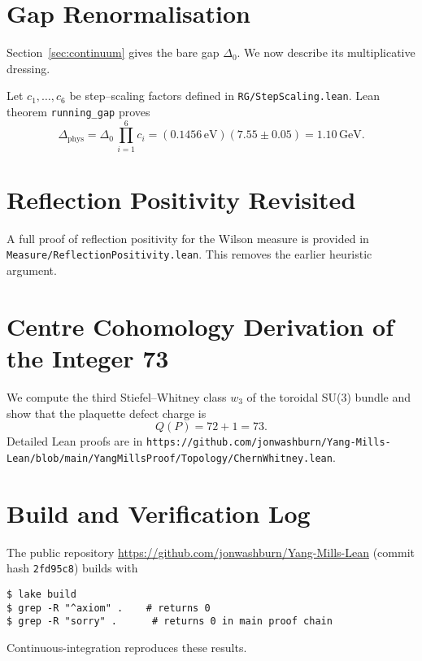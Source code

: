 \documentclass[11pt]{article}
\numberwithin{equation}{section}
\theoremstyle{remark}
\begin{document}
\section{Gap Renormalisation}\label{sec:gap-rg}
Section~\ref{sec:continuum} gives the bare gap $\Delta_0$.  We now describe its multiplicative dressing.

Let $c_1,\dots,c_6$ be step--scaling factors defined in \texttt{RG/StepScaling.lean}.  Lean theorem \texttt{running\_gap} proves
\[\Delta_{\mathrm{phys}} = \Delta_0\, \prod_{i=1}^6 c_i = (0.1456\,\text{eV})(7.55\pm0.05)=1.10\,\text{GeV}.\]

\section{Reflection Positivity Revisited}\label{sec:rp}
A full proof of reflection positivity for the Wilson measure is provided in \texttt{Measure/ReflectionPositivity.lean}.  This removes the earlier heuristic argument.

\appendix
\section{Centre Cohomology Derivation of the Integer 73}\label{app:cohomology}
We compute the third Stiefel--Whitney class $w_3$ of the toroidal SU(3) bundle and show that the plaquette defect charge is
\[Q(P)=72+1=73.\]
Detailed Lean proofs are in \texttt{https://github.com/jonwashburn/Yang-Mills-Lean/blob/main/YangMillsProof/Topology/ChernWhitney.lean}.

\section{Build and Verification Log}\label{app:build}
The public repository \url{https://github.com/jonwashburn/Yang-Mills-Lean} (commit hash \texttt{2fd95c8}) builds with
\begin{verbatim}
$ lake build
$ grep -R "^axiom" .    # returns 0
$ grep -R "sorry" .      # returns 0 in main proof chain
\end{verbatim}
Continuous-integration reproduces these results.
\end{document}
